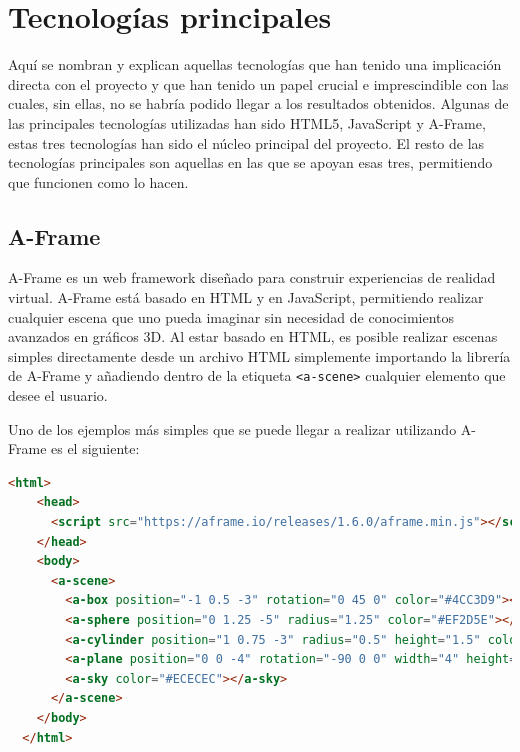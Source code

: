 \documentclass[a4paper, 12pt]{book}
\begin{document}
\section{Tecnologías principales} 
\label{sec:tecnologias-principales} %

Aquí se nombran y explican aquellas tecnologías que han tenido una implicación directa con el proyecto y que han tenido un papel crucial e imprescindible con las cuales, sin ellas, no se habría podido llegar a los resultados obtenidos. 
Algunas de las principales tecnologías utilizadas han sido HTML5, JavaScript y A-Frame, estas tres tecnologías han sido el núcleo principal del proyecto. El resto de las tecnologías principales 
son aquellas en las que se apoyan esas tres, permitiendo que funcionen como lo hacen. 

\subsection{A-Frame}
\label{subsec: A-Frame}

A-Frame \cite{aframe_docs} es un web framework diseñado para construir experiencias de realidad virtual. A-Frame está basado en HTML y en JavaScript, permitiendo realizar cualquier escena que uno pueda imaginar sin necesidad de conocimientos avanzados en gráficos 3D. 
Al estar basado en HTML, es posible realizar escenas simples directamente desde un archivo HTML simplemente importando la librería de A-Frame y añadiendo dentro de la etiqueta \texttt{<a-scene>} cualquier elemento que desee el usuario.  

Uno de los ejemplos más simples que se puede llegar a realizar utilizando A-Frame es el siguiente:

\begin{lstlisting}[language=HTML, caption=Escena A-Frame básica, captionpos=b]
  <html>
    <head>
      <script src="https://aframe.io/releases/1.6.0/aframe.min.js"></script>
    </head>
    <body>
      <a-scene>
        <a-box position="-1 0.5 -3" rotation="0 45 0" color="#4CC3D9"></a-box>
        <a-sphere position="0 1.25 -5" radius="1.25" color="#EF2D5E"></a-sphere>
        <a-cylinder position="1 0.75 -3" radius="0.5" height="1.5" color="#FFC65D"></a-cylinder>
        <a-plane position="0 0 -4" rotation="-90 0 0" width="4" height="4" color="#7BC8A4"></a-plane>
        <a-sky color="#ECECEC"></a-sky>
      </a-scene>
    </body>
  </html>
\end{lstlisting}
\end{document}
